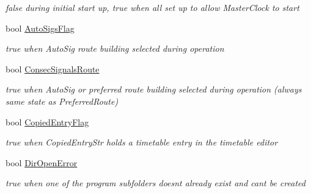 \begin{DoxyCompactItemize}
\begin{DoxyCompactList}\small\item\em false during initial start up, true when all set up to allow Master\+Clock to start \end{DoxyCompactList}\item 
\mbox{\label{class_t_interface_ac69da3959096dbcc7d4f83a4b39119ce}} 
bool \mbox{\hyperlink{class_t_interface_ac69da3959096dbcc7d4f83a4b39119ce}{Auto\+Sigs\+Flag}}
\begin{DoxyCompactList}\small\item\em true when Auto\+Sig route building selected during operation \end{DoxyCompactList}\item 
\mbox{\label{class_t_interface_a90265cdb9d53302216a4d251f8901ca1}} 
bool \mbox{\hyperlink{class_t_interface_a90265cdb9d53302216a4d251f8901ca1}{Consec\+Signals\+Route}}
\begin{DoxyCompactList}\small\item\em true when Auto\+Sig or preferred route building selected during operation (always same state as Preferred\+Route) \end{DoxyCompactList}\item 
\mbox{\label{class_t_interface_a4d521aed31c0bcbe61090e7bcdb658ea}} 
bool \mbox{\hyperlink{class_t_interface_a4d521aed31c0bcbe61090e7bcdb658ea}{Copied\+Entry\+Flag}}
\begin{DoxyCompactList}\small\item\em true when Copied\+Entry\+Str holds a timetable entry in the timetable editor \end{DoxyCompactList}\item 
\mbox{\label{class_t_interface_ae989b91d63d00b75971cd845cc3410b2}} 
bool \mbox{\hyperlink{class_t_interface_ae989b91d63d00b75971cd845cc3410b2}{Dir\+Open\+Error}}
\begin{DoxyCompactList}\small\item\em true when one of the program subfolders doesn\textquotesingle{}t already exist and can\textquotesingle{}t be created \end{DoxyCompactList}\item 
\mbox{\label{class_t_interface_adfaa3df9168b5f57613e4ff8b1fbf1fe}} 

\end{DoxyCompactItemize}
